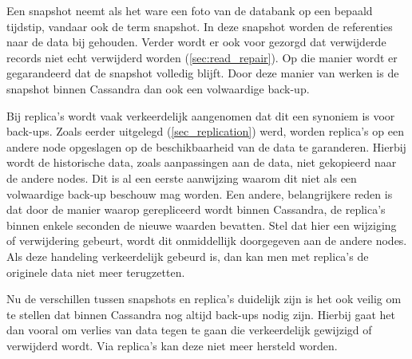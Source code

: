 Een snapshot neemt als het ware een foto van de databank op een bepaald tijdstip, vandaar ook de term snapshot.
In deze snapshot worden de referenties naar de data bij gehouden.
Verder wordt er ook voor gezorgd dat verwijderde records niet echt verwijderd worden (\ref{sec:read_repair}).
Op die manier wordt er gegarandeerd dat de snapshot volledig blijft.
Door deze manier van werken is de snapshot binnen Cassandra dan ook een volwaardige back-up.

Bij replica's wordt vaak verkeerdelijk aangenomen dat dit een synoniem is voor back-ups.
Zoals eerder uitgelegd (\ref{sec_replication}) werd, worden replica's op een andere node opgeslagen op de beschikbaarheid van de data te garanderen.
Hierbij wordt de historische data, zoals aanpassingen aan de data, niet gekopieerd naar de andere nodes.
Dit is al een eerste aanwijzing waarom dit niet als een volwaardige back-up beschouw mag worden.
Een andere, belangrijkere reden is dat door de manier waarop gerepliceerd wordt binnen Cassandra, de replica's binnen enkele seconden de nieuwe waarden bevatten.
Stel dat hier een wijziging of verwijdering gebeurt, wordt dit onmiddellijk doorgegeven aan de andere nodes.
Als deze handeling verkeerdelijk gebeurd is, dan kan men met replica's de originele data niet meer terugzetten.

Nu de verschillen tussen snapshots en replica's duidelijk zijn is het ook veilig om te stellen dat binnen Cassandra nog altijd back-ups nodig zijn.
Hierbij gaat het dan vooral om verlies van data tegen te gaan die verkeerdelijk gewijzigd of verwijderd wordt.
Via replica's kan deze niet meer hersteld worden.